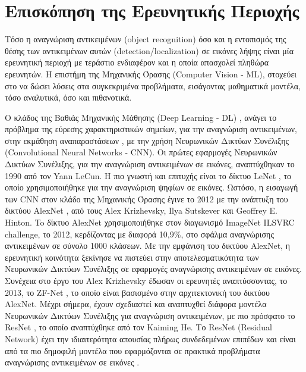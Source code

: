 \chapter{Επισκόπηση της Ερευνητικής Περιοχής}
\label{chapter:sota}
Τόσο η αναγνώριση αντικειμένων (object recognition) όσο και η εντοπισμός
της θέσης των αντικειμένων αυτών (detection/localization) σε εικόνες λήψης
είναι μία ερευνητική περιοχή με τεράστιο ενδιαφέρον και
η οποία απασχολεί πληθώρα ερευνητών. Η επιστήμη της Μηχανικής Όρασης (Computer Vision - ML),
στοχεύει στο να δώσει λύσεις στα συγκεκριμένα προβλήματα, εισάγοντας μαθηματικά
μοντέλα, τόσο αναλυτικά, όσο και πιθανοτικά.

Ο κλάδος της Βαθιάς Μηχανικής Μάθησης (Deep Learning - DL) \cite{Goodfellow-et-al-2016-Book},
ανάγει το πρόβλημα της εύρεσης χαρακτηριστικών σημείων, για την αναγνώριση αντικειμένων,
στην εκμάθηση αναπαραστάσεων \cite{bengio2013representation},
με την χρήση Νευρωνικών Δικτύων Συνέλιξης (Convolutional Neural Networks - CNN).
Οι πρώτες εφαρμογές Νευρωνικών Δικτύων Συνέλιξης, για την αναγνώριση αντικειμένων
σε εικόνες, αναπτύχθηκαν το 1990 από τον Yann LeCun.
Η πιο γνωστή και επιτυχής είναι το δίκτυο LeNet \cite{lecun1998gradient}, το οποίο
χρησιμοποιήθηκε για την αναγνώριση ψηφίων σε εικόνες.
Ωστόσο, η εισαγωγή των CNN στον κλάδο της Μηχανικής Όρασης έγινε το 2012 με
την ανάπτυξη του δικτύου AlexNet \cite{NIPS2012_4824}, από τους Alex Krizhevsky,
Ilya Sutskever και Geoffrey E. Hinton. To δίκτυο AlexNet χρησιμοποιήθηκε
στον διαγωνισμό ImageNet ILSVRC challenge, το 2012, κερδίζοντας με διαφορά
10,9\%, στο σφάλμα αναγνώρισης αντικειμένων σε σύνολο 1000 κλάσεων.
Με την εμφάνιση του δικτύου AlexNet, η ερευνητική κοινότητα ξεκίνησε να
πιστεύει στην αποτελεσματικότητα των Νευρωνικών Δικτύων Συνέλιξης σε εφαρμογές αναγνώρισης
αντικειμένων σε εικόνες. Συνέχεια στο έργο του Alex Krizhevsky έδωσαν οι
ερευνητές αναπτύσσοντας, το 2013, το ZF-Net \cite{DBLP:journals/corr/ZeilerF13}, το οποίο είναι
βασισμένο στην αρχιτεκτονική του δικτύου AlexNet. Μέχρι σήμερα, έχουν σχεδιαστεί
και αναπτυχθεί διάφορα μοντέλα Νευρωνικών Δικτύων Συνέλιξης για
αναγνώριση αντικειμένων, με πιο πρόσφατο το ResNet \cite{DBLP:journals/corr/HeZRS15},
το οποίο αναπτύχθηκε από τον Kaiming He. Το ResNet (Residual Network) έχει την
ιδιαιτερότητα απουσίας πλήρως συνδεδεμένων επιπέδων και είναι από τα πιο δημοφιλή
μοντέλα που εφαρμόζονται σε πρακτικά προβλήματα αναγνώρισης αντικειμένων σε
εικόνες \cite{DBLP:journals/corr/HeZR016}.

